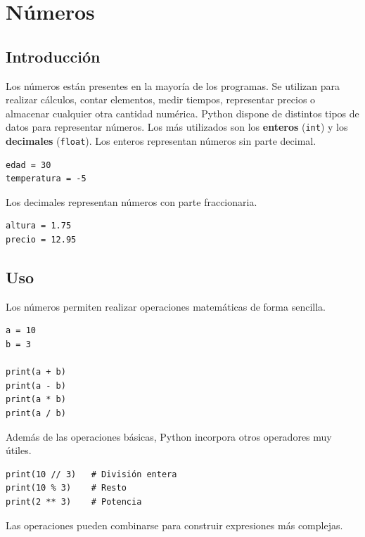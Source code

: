 \documentclass[11pt,a5paper,twoside]{book}
\begin{document}
\section{Números}
\subsection{Introducción}
Los números están presentes en la mayoría de los programas. Se utilizan para realizar cálculos, contar elementos, medir tiempos, representar precios o almacenar cualquier otra cantidad numérica.
Python dispone de distintos tipos de datos para representar números. Los más utilizados son los \textbf{enteros} ({\scriptsize \texttt{int}}) y los \textbf{decimales} ({\scriptsize \texttt{float}}).
Los enteros representan números sin parte decimal.


\begin{tcolorbox}
\scriptsize
 \begin{verbatim}
edad = 30
temperatura = -5
\end{verbatim}
\end{tcolorbox}
Los decimales representan números con parte fraccionaria.


\begin{tcolorbox}
\scriptsize
 \begin{verbatim}
altura = 1.75
precio = 12.95
\end{verbatim}
\end{tcolorbox}
\subsection{Uso}
Los números permiten realizar operaciones matemáticas de forma sencilla.


\begin{tcolorbox}
\scriptsize
 \begin{verbatim}
a = 10
b = 3

print(a + b)
print(a - b)
print(a * b)
print(a / b)
\end{verbatim}
\end{tcolorbox}
Además de las operaciones básicas, Python incorpora otros operadores muy útiles.


\begin{tcolorbox}
\scriptsize
 \begin{verbatim}
print(10 // 3)   # División entera
print(10 % 3)    # Resto
print(2 ** 3)    # Potencia
\end{verbatim}
\end{tcolorbox}
Las operaciones pueden combinarse para construir expresiones más complejas.
\end{document}
